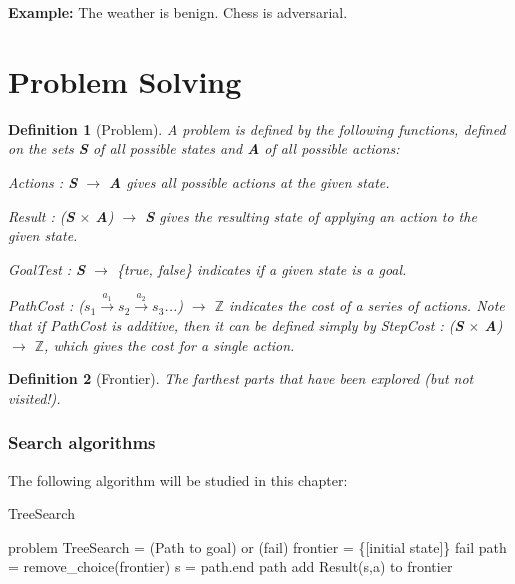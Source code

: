 \documentclass[10pt,a4paper]{article}
\newtheorem{defin}{Definition}
\newenvironment{itemize_packed}{
\begin{itemize}
\setlength{\itemsep}{0pt}
\setlength{\parskip}{0pt}
}{\end{itemize}}
\begin{document}
\textbf{Example:} The weather is benign. Chess is adversarial.


\part{Problem Solving}

\begin{defin}[Problem]
A problem is defined by the following functions, defined on the sets \textbf{S} of all possible states and \textbf{A} of all possible actions:
\begin{itemize_packed}
\item \emph{Actions} : \textbf{S} $\rightarrow$ \textbf{A} gives all possible actions at the given state.
\item \emph{Result} : (\textbf{S} $\times$ \textbf{A}) $\rightarrow$ \textbf{S} gives the resulting state of applying an action to the given state.
\item \emph{GoalTest} : \textbf{S} $\rightarrow$ \emph{\{true, false\}} indicates if a given state is a goal.
\item \emph{PathCost} : ($s_1\xrightarrow{a_1}s_2\xrightarrow{a_2}s_3$...) $\rightarrow$ $\mathbb{Z}$ indicates the cost of a series of actions. Note that if \emph{PathCost} is additive, then it can be defined simply by \emph{StepCost} : (\textbf{S} $\times$ \textbf{A}) $\rightarrow$ $\mathbb{Z}$, which gives the cost for a single action.
\end{itemize_packed}
\end{defin}

\begin{defin}[Frontier]
The farthest parts that have been \emph{explored} (but not visited!).
\end{defin}

\section{Search algorithms} %

The following algorithm will be studied in this chapter:

\begin{algorithm}
\caption{TreeSearch}
\begin{algorithmic}[1]
\REQUIRE problem
\ENSURE TreeSearch = (Path to goal) or (fail)
\STATE frontier = \{[initial state]\}
\LOOP
		\RETURN fail
	\ENDIF
	\STATE \label{remove_choice} path = remove\_choice(frontier)
	\STATE s = path.end
		\RETURN path
	\ENDIF
		\STATE \label{addResult} add Result(s,a) to frontier
	\ENDFOR
\ENDLOOP
\end{algorithmic}
\end{algorithm}
\end{document}
